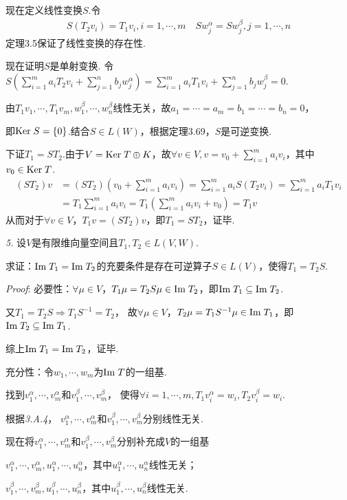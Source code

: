 现在定义线性变换$S$.令
    \begin{align*}
        S(T_2v_i)=T_1v_i,i=1,\cdots,m \quad Sw_j^\alpha=Sw_j^\beta,j=1,\cdots,n
    \end{align*}
定理3.5保证了线性变换的存在性.

现在证明$S$是单射变换.
令$S(\sum_{i=1}^m a_iT_2v_i+\sum_{j=1}^n b_jw_j^\alpha)=\sum_{i=1}^m a_iT_1v_i+\sum_{j=1}^n b_jw_j^\beta=0$.

由$T_1v_1,\cdots,T_1v_m,w_1^\beta,\cdots,w_n^\beta$线性无关，故$a_1=\cdots=a_m=b_1=\cdots=b_n=0$，

即$\mathrm{Ker \;} S=\{0\}$.结合$S \in L(W)$，根据定理3.69，$S$是可逆变换.

下证$T_1=ST_2$.由于$V=\mathrm{Ker \;} T \oplus K$，故$\forall v \in V,v=v_0+\sum_{i=1}^m a_iv_i$，其中$v_0 \in \mathrm{Ker \;} T$.
    \begin{align*}
        (ST_2)v&=(ST_2)(v_0+\sum_{i=1}^m a_iv_i)=\sum_{i=1}^m a_iS(T_2v_i)=\sum_{i=1}^m a_iT_1v_i \\
            &=T_1\sum_{i=1}^m a_iv_i=T_1(\sum_{i=1}^m a_iv_i+v_0)=T_1v
    \end{align*}
从而对于$\forall v \in V$，$T_1v=(ST_2)v$，即$T_1=ST_2$，证毕.

\newpage

\textit{5.}
设$V$是有限维向量空间且$T_1,T_2 \in L(V,W)$.

求证：$\mathrm{Im \;} T_1=\mathrm{Im \;} T_2$的充要条件是存在可逆算子$S \in L(V)$，使得$T_1=T_2S$.

\textit{Proof}:
必要性：$\forall \mu \in V$，$T_1 \mu =T_2S \mu \in \mathrm{Im \;} T_2$，即$\mathrm{Im \;} T_1 \subseteq \mathrm{Im \;} T_2$.

又$T_1=T_2S \Rightarrow T_1S^{-1}=T_2$，
故$\forall \mu \in V$，$T_2 \mu =T_1S^{-1} \mu \in \mathrm{Im \;} T_1$，即$\mathrm{Im \;} T_2 \subseteq \mathrm{Im \;} T_1$.

综上$\mathrm{Im \;} T_1=\mathrm{Im \;} T_2$，证毕.

充分性：令$w_1,\cdots,w_m$为$\mathrm{Im \;} T$的一组基.

找到$v_1^\alpha,\cdots,v_m^\alpha$和$v_1^\beta,\cdots,v_m^\beta$，
使得$\forall i=1,\cdots,m,T_1v_i^\alpha=w_i,T_2v_i^\beta=w_i$.

根据\textit{3.A.4}，
$v_1^\alpha,\cdots,v_m^\alpha$和$v_1^\beta,\cdots,v_m^\beta$分别线性无关.

现在将$v_1^\alpha,\cdots,v_m^\alpha$和$v_1^\beta,\cdots,v_m^\beta$分别补充成$V$的一组基

$v_1^\alpha,\cdots,v_m^\alpha,u_1^\alpha,\cdots,u_n^\alpha$，其中$u_1^\alpha,\cdots,u_n^\alpha$线性无关；

$v_1^\beta,\cdots,v_m^\beta,u_1^\beta,\cdots,u_n^\beta$，其中$u_1^\beta,\cdots,u_n^\beta$线性无关.

